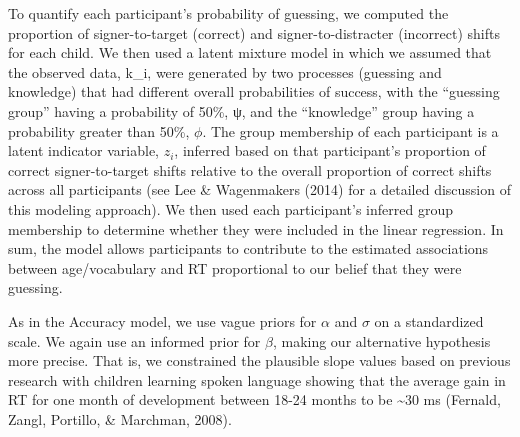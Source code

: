 \documentclass[oneside]{report}
\begin{document}
To quantify each participant's probability of guessing, we computed the
proportion of signer-to-target (correct) and signer-to-distracter
(incorrect) shifts for each child. We then used a latent mixture model
in which we assumed that the observed data, k\_i, were generated by two
processes (guessing and knowledge) that had different overall
probabilities of success, with the ``guessing group'' having a
probability of 50\%, ψ, and the ``knowledge'' group having a probability
greater than 50\%, \(\phi\). The group membership of each participant is
a latent indicator variable, \(z_i\), inferred based on that
participant's proportion of correct signer-to-target shifts relative to
the overall proportion of correct shifts across all participants (see
Lee \& Wagenmakers (2014) for a detailed discussion of this modeling
approach). We then used each participant's inferred group membership to
determine whether they were included in the linear regression. In sum,
the model allows participants to contribute to the estimated
associations between age/vocabulary and RT proportional to our belief
that they were guessing.

As in the Accuracy model, we use vague priors for \(\alpha\) and
\(\sigma\) on a standardized scale. We again use an informed prior for
\(\beta\), making our alternative hypothesis more precise. That is, we
constrained the plausible slope values based on previous research with
children learning spoken language showing that the average gain in RT
for one month of development between 18-24 months to be
\textasciitilde{}30 ms (Fernald, Zangl, Portillo, \& Marchman, 2008).
\end{document}
